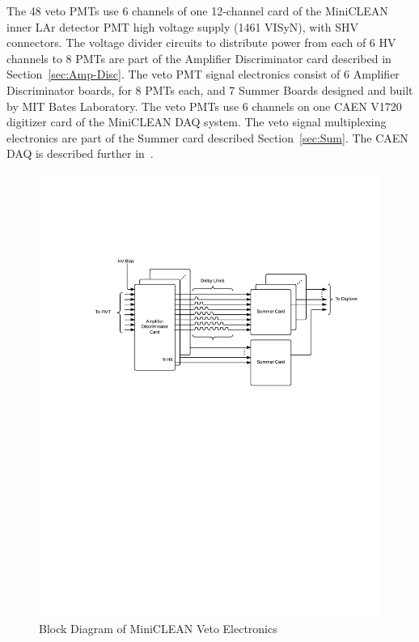 \documentclass{JINST}
\begin{document}
The 48 veto PMTs use 6 channels of one 12-channel card of the
MiniCLEAN inner LAr detector PMT high voltage supply (1461 VISyN),
with SHV connectors.  The voltage divider circuits to distribute power
from each of 6 HV channels to 8 PMTs are part of the Amplifier
Discriminator card described in Section~\ref{sec:Amp-Disc}.  The veto
PMT signal electronics consist of 6 Amplifier Discriminator boards,
for 8 PMTs each, and 7 Summer Boards designed and built by MIT Bates
Laboratory.  The veto PMTs use 6 channels on one CAEN V1720 digitizer
card of the MiniCLEAN DAQ system.  The veto signal multiplexing
electronics are part of the Summer card described
Section~\ref{sec:Sum}.  The CAEN DAQ is described further
in~\cite{ref:gastler_thesis}.

\begin{figure}[ht]
\begin{center}
\includegraphics[width=5in, keepaspectratio=true, trim=1.25in 5.75in 0.5in 2in, clip=true]{graphics/block}
\caption{Block Diagram of MiniCLEAN Veto Electronics
\label{fig:block_diagram}}
\end{center}
\end{figure}
\end{document}
